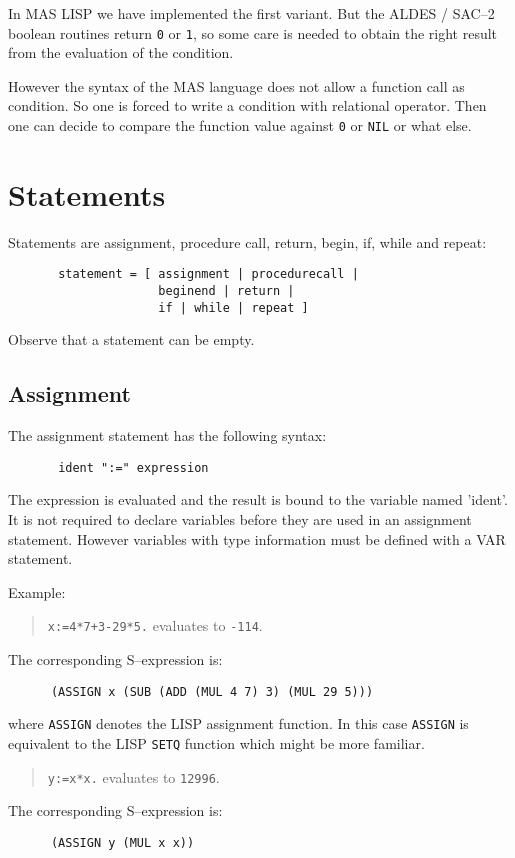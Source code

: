 In MAS LISP we have implemented the first variant.
But the ALDES / SAC--2 boolean routines return
\verb/0/ or \verb/1/, so some care is needed 
to obtain the right result from the evaluation of the
condition.
 
However the syntax of the MAS language does not
allow a function call as condition.
So one is forced to write a condition with relational
operator. Then one can decide to compare the 
function value against \verb/0/ or \verb/NIL/ or what else.


\section{Statements}

Statements are assignment, procedure call, return,
begin, if, while and repeat:
\begin{verbatim}
       statement = [ assignment | procedurecall |
                     beginend | return |
                     if | while | repeat ]
\end{verbatim}
Observe that a statement can be empty.


\subsection{Assignment}

The assignment statement has the following syntax:
\begin{verbatim}
       ident ":=" expression 
\end{verbatim}

The expression is evaluated and the result is
bound to the variable named 'ident'.
It is not required to declare variables before they are used
in an assignment statement.
However variables with type information 
must be defined with a VAR statement.

Example:
\begin{quote}
      \verb/x:=4*7+3-29*5./ evaluates to \verb/-114/.
\end{quote}
{\small
The corresponding S--expression is:
\begin{verbatim}
      (ASSIGN x (SUB (ADD (MUL 4 7) 3) (MUL 29 5)))
\end{verbatim}
where \verb/ASSIGN/ denotes the LISP assignment function.
In this case \verb/ASSIGN/ is equivalent 
to the LISP \verb/SETQ/ 
function which might be more familiar. 
}

\begin{quote}
      \verb/y:=x*x./ evaluates to \verb/12996/.
\end{quote}
{\small
The corresponding S--expression is:
\begin{verbatim}
      (ASSIGN y (MUL x x))
\end{verbatim}
}


